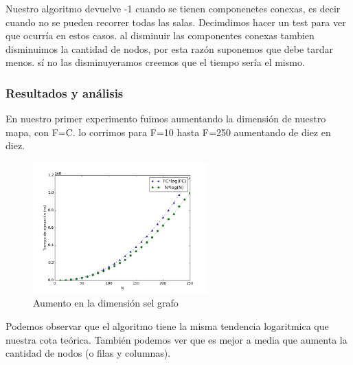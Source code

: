 \documentclass[spanish,12pt]{article}
\begin{document}
Nuestro algoritmo devuelve -1 cuando se tienen componenetes conexas, es decir cuando no se pueden recorrer todas las salas. Decimdimos hacer un test para ver que ocurría en estos casos. al disminuir las componentes conexas tambien disminuimos la cantidad de nodos, por esta razón suponemos que debe tardar menos. sí no las disminuyeramos creemos que el tiempo sería el mismo.

\subsubsection{Resultados y análisis}

En nuestro primer experimento fuimos aumentando la dimensión de nuestro mapa, con F=C. lo corrimos para F=10 hasta F=250 aumentando de diez en diez.

\begin{figure}[H]
\centering
\includegraphics[width=0.6\textwidth]{sinParedes}
\caption{Aumento en la dimensión sel grafo}
\end{figure}

Podemos observar que el algoritmo tiene la misma tendencia logaritmica que nuestra cota teórica. También podemos ver que es mejor a media que aumenta la cantidad de nodos (o filas y columnas).
\end{document}
